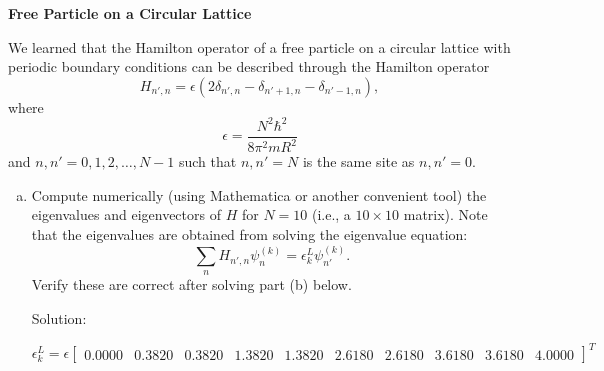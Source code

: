 \newpage
\begin{homeworkProblem}
    \textbf{Free Particle on a Circular Lattice}

    We learned that the Hamilton operator of a free particle on a circular lattice with periodic boundary conditions can be described through the Hamilton operator
    \[
        H_{n',n} = \epsilon \left( 2\delta_{n',n} - \delta_{n'+1,n} - \delta_{n'-1,n} \right),
    \]
    where
    \[
        \epsilon = \frac{N^2\hbar^2}{8\pi^2mR^2}
    \]
    and $n,n' = 0,1,2,\ldots,N-1$ such that $n,n'=N$ is the same site as $n,n'=0$.

    \begin{enumerate}[(a)]
        \item Compute numerically (using Mathematica or another convenient tool) the eigenvalues and eigenvectors of $H$ for $N=10$ (i.e., a $10\times10$ matrix). Note that the eigenvalues are obtained from solving the eigenvalue equation:
            \[
                \sum_n H_{n',n}\psi_n^{(k)} = \epsilon_k^L\psi_{n'}^{(k)}.
            \]
            Verify these are correct after solving part (b) below.

            \begin{callout}{Solution:}

                \footnotesize{
                    $$\epsilon_k^L = \epsilon\begin{bmatrix} 0.0000 & 0.3820 & 0.3820 & 1.3820 & 1.3820 & 2.6180 & 2.6180 & 3.6180 & 3.6180 & 4.0000 \end{bmatrix}^T$$

}
\end{callout}
\end{enumerate}
\end{homeworkProblem}
